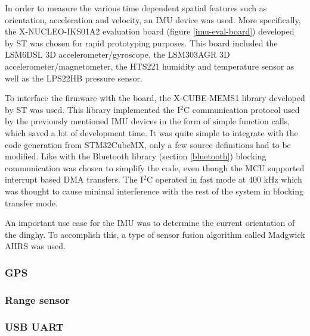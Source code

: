 In order to measure the various time dependent spatial features such as orientation, acceleration and velocity, an IMU device was used. More specifically, the X-NUCLEO-IKS01A2 \cite{x-nucleo-iks01a2} evaluation board (figure \ref{imu-eval-board}) developed by ST was chosen for rapid prototyping purposes. This board included the LSM6DSL 3D accelerometer/gyroscope, the LSM303AGR 3D accelerometer/magnetometer, the HTS221 humidity and temperature sensor as well as the LPS22HB pressure sensor.

To interface the firmware with the board, the X-CUBE-MEMS1 \cite{x-cube-mems1} library developed by ST was used. This library implemented the I$^2$C communication protocol used by the previously mentioned IMU devices in the form of simple function calls, which saved a lot of development time. It was quite simple to integrate with the code generation from STM32CubeMX, only a few source definitions had to be modified. Like with the Bluetooth library (section \ref{bluetooth}) blocking communication was chosen to simplify the code, even though the MCU supported interrupt based DMA transfers. The I$^2$C operated in fast mode at 400 kHz which was thought to cause minimal interference with the rest of the system in blocking transfer mode.

An important use case for the IMU was to determine the current orientation of the dinghy. To accomplish this, a type of sensor fusion algorithm called Madgwick AHRS \cite{madgwick} was used.

\subsubsection{GPS}

\subsubsection{Range sensor}

\subsubsection{USB UART}
